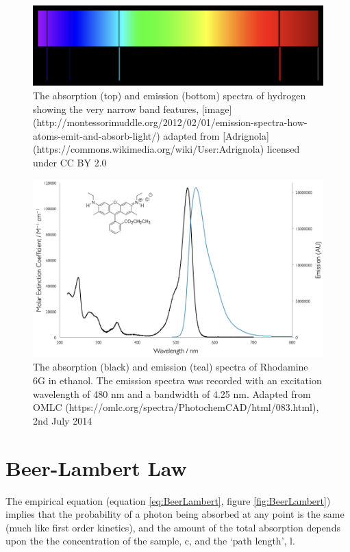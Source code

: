 \documentclass[
]{book}
\begin{document}
\begin{figure}

{\centering \includegraphics[width=0.7\linewidth]{images/HAbsEm} 

}

\caption{The absorption (top) and emission (bottom) spectra of hydrogen showing the very narrow band features, [image](http://montessorimuddle.org/2012/02/01/emission-spectra-how-atoms-emit-and-absorb-light/) adapted from [Adrignola](https://commons.wikimedia.org/wiki/User:Adrignola) licensed under CC BY 2.0}\label{fig:HAbsEm}
\end{figure}

\begin{figure}

{\centering \includegraphics[width=0.6\linewidth]{images/Rhodamine6GAbsEm} 

}

\caption{The absorption (black) and emission (teal) spectra of Rhodamine 6G in ethanol. The emission spectra was recorded with an excitation wavelength of 480 nm and a bandwidth of 4.25 nm. Adapted from OMLC (https://omlc.org/spectra/PhotochemCAD/html/083.html), 2nd July 2014}\label{fig:RhoAbsEm}
\end{figure}

\hypertarget{sec:BeerLambert}{%
\section{Beer-Lambert Law}\label{sec:BeerLambert}}

The empirical equation (equation \eqref{eq:BeerLambert}, figure \ref{fig:BeerLambert}) implies that the probability of a photon being absorbed at any point is the same (much like first order kinetics), and the amount of the total absorption depends upon the the concentration of the sample, c, and the `path length', l.
\end{document}

